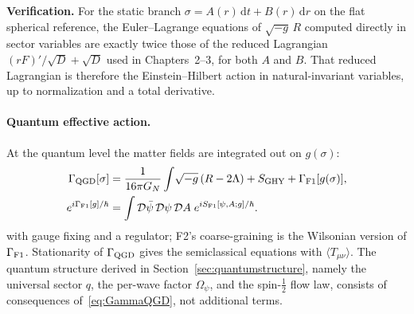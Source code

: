 \documentclass[11pt,a4paper]{article}
\begin{document}
\noindent\textbf{Verification.} For the static branch
$\sigma=A(r)\,\mathrm dt+B(r)\,\mathrm dr$ on the flat spherical reference, the Euler--Lagrange
equations of $\sqrt{-g}\,R$ computed directly in sector variables are exactly twice those of
the reduced Lagrangian $(rF)'/\sqrt D+\sqrt D$ used in Chapters~2--3, for both $A$ and $B$.
That reduced Lagrangian is therefore the Einstein--Hilbert action in natural-invariant
variables, up to normalization and a total derivative.

\paragraph{Quantum effective action.} At the quantum level the matter fields are
integrated out on $g(\sigma)$:
\begin{equation}\label{eq:GammaQGD}
\begin{aligned}
\Gamma_{\rm QGD}[\sigma]&=\frac{1}{16\pi G_N}\int\!\sqrt{-g}\,(R-2\Lambda)
+S_{\rm GHY}+\Gamma_{\rm F1}[g(\sigma)],\\
e^{i\Gamma_{\rm F1}[g]/\hbar}&=\int\mathcal D\bar\psi\,\mathcal D\psi\,\mathcal DA\;e^{iS_{\rm F1}[\psi,A;g]/\hbar}.
\end{aligned}
\end{equation}
with gauge fixing and a regulator; F2's coarse-graining is the Wilsonian version of
$\Gamma_{\rm F1}$. Stationarity of $\Gamma_{\rm QGD}$ gives the semiclassical equations with
$\langle T_{\mu\nu}\rangle$. The quantum structure derived in Section~\ref{sec:quantumstructure}, namely the
universal sector $q$, the per-wave factor $\Omega_\psi$, and the spin-$\frac12$ flow law, consists of
consequences of~\eqref{eq:GammaQGD}, not additional terms.
\end{document}
